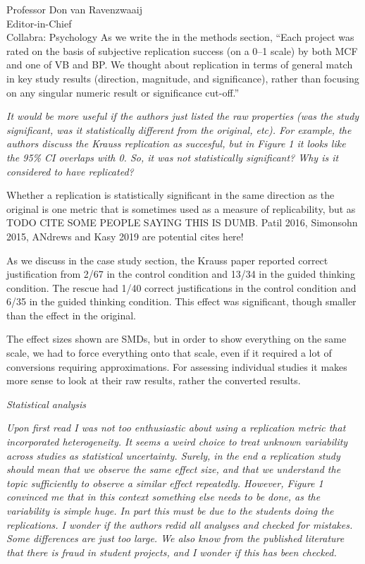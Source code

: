 \documentclass{stanfordletter}
\newcommand{\theysaid}[1]{\begin{leftbar} \noindent 
		\textsl{ #1}\end{leftbar}}
\begin{document}
\begin{letter}{Professor Don van Ravenzwaaij \\ Editor-in-Chief \\ Collabra: Psychology }
		As we write the in the methods section, ``Each project was rated on the basis of subjective replication success (on a 0--1 scale) by both MCF and one of VB and BP.
		We thought about replication in terms of general match in key study results (direction, magnitude, and significance), rather than focusing on any singular numeric result or significance cut-off.''
 
		
		\theysaid{
		It would be more useful if the authors just listed the raw properties (was the study significant, was it statistically different from the original, etc). For example, the authors discuss the Krauss replication as succesful, but in Figure 1 it looks like the 95\% CI overlaps with 0. So, it was not statistically significant? Why is it considered to have replicated?}
		
		Whether a replication is statistically significant in the same direction as the original is one metric that is sometimes used as a measure of replicability, but as TODO CITE SOME PEOPLE SAYING THIS IS DUMB. Patil 2016, Simonsohn 2015, ANdrews and Kasy 2019 are potential cites here!
		
		As we discuss in the case study section, the Krauss paper reported correct justification from 2/67 in the control condition and 13/34 in the guided thinking condition.  The rescue had 1/40  correct justifications in the control condition and 6/35 in the guided thinking condition. This effect was significant, though smaller than the effect in the original. 
		
		The effect sizes shown are SMDs, but in order to show everything on the same scale, we had to force everything onto that scale, even if it required a lot of conversions requiring approximations. For assessing individual studies it makes more sense to look at their raw results, rather the converted results. 
		
		\theysaid{Statistical analysis}
		\theysaid{Upon first read I was not too enthusiastic about using a replication metric that incorporated heterogeneity. It seems a weird choice to treat unknown variability across studies as statistical uncertainty. Surely, in the end a replication study should mean that we observe the same effect size, and that we understand the topic sufficiently to observe a similar effect repeatedly. However, Figure 1 convinced me that in this context something else needs to be done, as the variability is simple huge. In part this must be due to the students doing the replications. I wonder if the authors redid all analyses and checked for mistakes. Some differences are just too large. We also know from the published literature that there is fraud in student projects, and I wonder if this has been checked.}
		

\end{letter}
\end{document}
